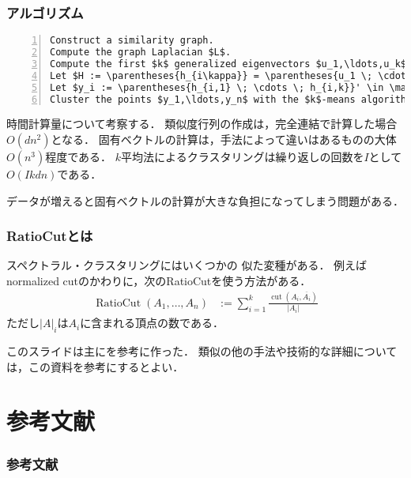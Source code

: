 \documentclass[10pt,hyperref={unicode}]{beamer}
\DeclareMathOperator*{\cut}{cut}
\DeclareMathOperator*{\RatioCut}{RatioCut}
\newcommand{\absolute}[1]{\left|#1\right|}
\newcommand{\parentheses}[1]{\left(#1\right)}
\begin{document}
\begin{frame}[fragile]
\frametitle{アルゴリズム}
\begin{lstlisting}[title={\texttt{Normalized spectral clustering according to Shi and Malik}},mathescape,numbers=left,breaklines]
Construct a similarity graph.
Compute the graph Laplacian $L$.
Compute the first $k$ generalized eigenvectors $u_1,\ldots,u_k$ of the generalized eigenproblem $Lu = \lambda Du$.
Let $H := \parentheses{h_{i\kappa}} = \parentheses{u_1 \; \cdots \; u_k} \in \mathbb{R}^{n \times k}$.
Let $y_i := \parentheses{h_{i,1} \; \cdots \; h_{i,k}}' \in \mathbb{R}^k\,\parentheses{i = 1,\ldots,n}$.
Cluster the points $y_1,\ldots,y_n$ with the $k$-means algorithm into clusters $C_1,\ldots,C_k$.
\end{lstlisting}

\bigskip

時間計算量について考察する．
類似度行列の作成は，完全連結で計算した場合$O\parentheses{dn^2}$となる．
固有ベクトルの計算は，手法によって違いはあるものの大体$O\parentheses{n^3}$程度である．
$k$平均法によるクラスタリングは繰り返しの回数を$I$として$O\parentheses{Ikdn}$である．

\bigskip

データが増えると固有ベクトルの計算が大きな負担になってしまう問題がある．
\end{frame}

\begin{frame}
\frametitle{RatioCutとは}
スペクトラル・クラスタリングにはいくつかの
似た変種がある．
例えばnormalized cutのかわりに，次のRatioCutを使う方法がある．
\begin{align*}
    \RatioCut \parentheses{A_1,\ldots,A_n}
    &:= \sum_{i = 1}^k \frac{\cut\parentheses{A_i,\overline{A_i}}}{\absolute{A_i}}
\end{align*}
ただし$\absolute{A}_i$は$A_i$に含まれる頂点の数である．

\bigskip

このスライドは主に\cite{luxburg2007spectral}を参考に作った．
類似の他の手法や技術的な詳細については，この資料を参考にするとよい．

\end{frame}

\section{参考文献}
\begin{frame}
\frametitle{参考文献}


\end{frame}
\end{document}
